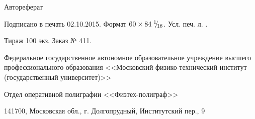 \clearpage
\thispagestyle{empty}

\phantom{top}
\vspace{0pt plus5fill} %
\begin{center}
\thesisAuthor
\end{center}

\vspace{0pt plus1fill}
\begin{center}
\large \thesisTitle
\vspace{0pt plus.5fill}
\large{Автореферат}
\end{center}

\vspace{0pt plus1fill}
\FPeval{}\FPeval{}
\begin{center}
Подписано в печать 02.10.2015. Формат $60 \times 84\; {}^{1}\mkern-5mu/{\!}_{16}$. Усл. печ. л. .

Тираж 100 экз. Заказ № 411.

Федеральное государственное автономное образовательное учреждение высшего профессионального образования
<<Московский физико-технический институт (государственный университет)>>

Отдел оперативной полиграфии <<Физтех-полиграф>>

141700, Московская обл., г. Долгопрудный, Институтский пер., 9
\end{center}

\vspace{0pt plus3fill}
\phantom{bottom}

